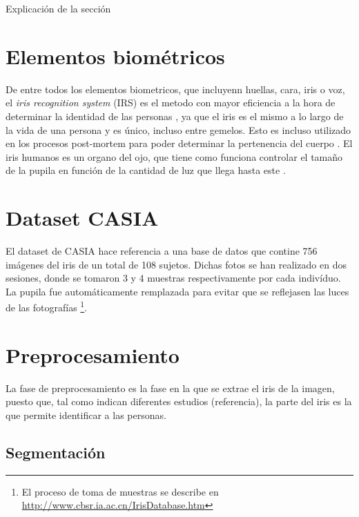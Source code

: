  \label{capitulo3}

Explicación de la sección


\section{Elementos biométricos}

De entre todos los elementos biometricos, que incluyenn huellas, cara, iris o voz, el \textit{iris recognition system} (IRS) es el metodo con mayor eficiencia a la hora de determinar la identidad
de las personas \cite{malgheet_iris_2021}, ya que el iris es el mismo a lo largo de la vida de una persona y es único, incluso entre gemelos. Esto es incluso utilizado en los procesos 
post-mortem para poder determinar la pertenencia del cuerpo \cite{boyd_post-mortem_2020}. El iris humanos es un organo del ojo, que tiene como funciona controlar el tamaño
de la pupila en función de la cantidad de luz que llega hasta este \cite{boyd_post-mortem_2020}.

\section{Dataset CASIA}	

El dataset de CASIA hace referencia a una base de datos que contine 756 imágenes del iris de un total de 108 sujetos. 
Dichas fotos se han realizado en dos sesiones, donde se tomaron 3 y 4 muestras respectivamente por cada indivíduo. 
La pupila fue automáticamente remplazada para evitar que se reflejasen las luces de las fotografías 
\footnote{El proceso de toma de muestras se describe en \url{http://www.cbsr.ia.ac.cn/IrisDatabase.htm}}.




\section{Preprocesamiento}

La fase de preprocesamiento es la fase en la que se extrae el iris de la imagen, puesto que, tal como indican diferentes estudios (referencia), la parte del iris es la que 
permite identificar a las personas.

\subsection{Segmentación}

